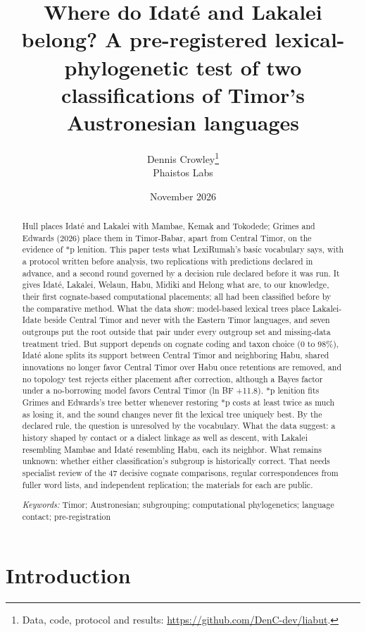 \documentclass[11pt]{article}
\title{Where do Idaté and Lakalei belong? A pre-registered lexical-phylogenetic test of two classifications of Timor's Austronesian languages}
\author{Dennis Crowley\thanks{Data, code, protocol and results: \url{https://github.com/DenC-dev/liabut}.}\\[2pt]
  \normalsize Phaistos Labs}
\date{November 2026}
\begin{document}
\maketitle

\begin{abstract}
\noindent Hull places Idaté and Lakalei with Mambae, Kemak and Tokodede; Grimes and Edwards (2026) place them in Timor-Babar, apart from Central Timor, on the evidence of *p lenition. This paper tests what LexiRumah's basic vocabulary says, with a protocol written before analysis, two replications with predictions declared in advance, and a second round governed by a decision rule declared before it was run. It gives Idaté, Lakalei, Welaun, Habu, Midiki and Helong what are, to our knowledge, their first cognate-based computational placements; all had been classified before by the comparative method. What the data show: model-based lexical trees place Lakalei-Idate beside Central Timor and never with the Eastern Timor languages, and seven outgroups put the root outside that pair under every outgroup set and missing-data treatment tried. But support depends on cognate coding and taxon choice (0 to 98\%), Idaté alone splits its support between Central Timor and neighboring Habu, shared innovations no longer favor Central Timor over Habu once retentions are removed, and no topology test rejects either placement after correction, although a Bayes factor under a no-borrowing model favors Central Timor (ln BF +11.8). *p lenition fits Grimes and Edwards's tree better whenever restoring *p costs at least twice as much as losing it, and the sound changes never fit the lexical tree uniquely best. By the declared rule, the question is unresolved by the vocabulary. What the data suggest: a history shaped by contact or a dialect linkage as well as descent, with Lakalei resembling Mambae and Idaté resembling Habu, each its neighbor. What remains unknown: whether either classification's subgroup is historically correct. That needs specialist review of the 47 decisive cognate comparisons, regular correspondences from fuller word lists, and independent replication; the materials for each are public.

\medskip
\noindent\textit{Keywords:} Timor; Austronesian; subgrouping; computational phylogenetics; language contact; pre-registration
\end{abstract}

\section{Introduction}
\end{document}
